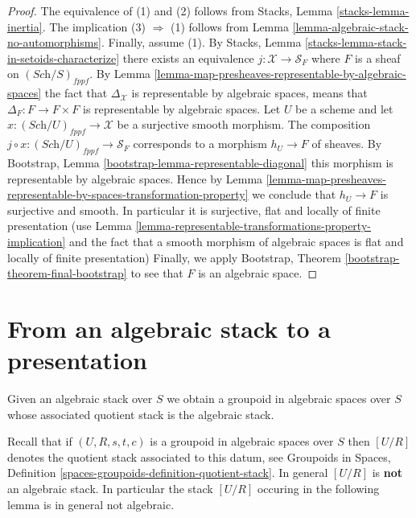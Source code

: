 \begin{proof}
The equivalence of (1) and (2) follows from
Stacks, Lemma \ref{stacks-lemma-inertia}.
The implication (3) $\Rightarrow$ (1) follows from
Lemma \ref{lemma-algebraic-stack-no-automorphisms}.
Finally, assume (1). By
Stacks, Lemma \ref{stacks-lemma-stack-in-setoids-characterize}
there exists an equivalence $j : \mathcal{X} \to \mathcal{S}_F$
where $F$ is a sheaf on $(\textit{Sch}/S)_{fppf}$.  By
Lemma \ref{lemma-map-presheaves-representable-by-algebraic-spaces}
the fact that $\Delta_\mathcal{X}$ is representable by algebraic
spaces, means that $\Delta_F : F \to F \times F$
is representable by algebraic spaces.
Let $U$ be a scheme and let $x : (\textit{Sch}/U)_{fppf} \to \mathcal{X}$
be a surjective smooth morphism. The composition
$j \circ x : (\textit{Sch}/U)_{fppf} \to \mathcal{S}_F$
corresponds to a morphism $h_U \to F$ of sheaves. By
Bootstrap, Lemma \ref{bootstrap-lemma-representable-diagonal}
this morphism is representable by algebraic spaces.
Hence by
Lemma
\ref{lemma-map-presheaves-representable-by-spaces-transformation-property}
we conclude that $h_U \to F$ is surjective and smooth.
In particular it is surjective, flat and locally of finite presentation
(use
Lemma \ref{lemma-representable-transformations-property-implication}
and the fact that a smooth morphism of algebraic spaces is flat and
locally of finite presentation)
Finally, we apply
Bootstrap, Theorem \ref{bootstrap-theorem-final-bootstrap}
to see that $F$ is an algebraic space.
\end{proof}







\section{From an algebraic stack to a presentation}
\label{section-stack-to-presentation}

\noindent
Given an algebraic stack over $S$ we obtain a groupoid in algebraic spaces
over $S$ whose associated quotient stack is the algebraic stack.

\medskip\noindent
Recall that if $(U, R, s, t, c)$ is a groupoid in algebraic spaces over $S$
then $[U/R]$ denotes the quotient stack associated to this datum, see
Groupoids in Spaces,
Definition \ref{spaces-groupoids-definition-quotient-stack}.
In general $[U/R]$ is {\bf not} an algebraic stack. In particular the
stack $[U/R]$ occuring in the following lemma is in general not
algebraic.

